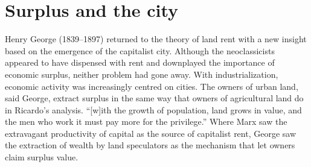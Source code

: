 \section{Surplus  and the city} \label{section-rent-industrial-city}
Henry George (1839--1897) returned to the theory of land rent with a new insight based on the emergence of the capitalist city. Although the neoclassicists appeared to have dispensed with rent and downplayed the importance of economic surplus, neither problem had gone away. With industrialization, economic activity was increasingly centred on cities.  
The owners of urban land,  said George,  extract surplus in the same way that owners of agricultural land do in Ricardo's analysis. ``[w]ith the growth of population, land grows in value, and the men who work it must pay more for the privilege.''  Where Marx saw the extravagant productivity of capital as the source of capitalist rent, George saw the extraction of wealth by land speculators as the mechanism that let owners claim surplus value. 

